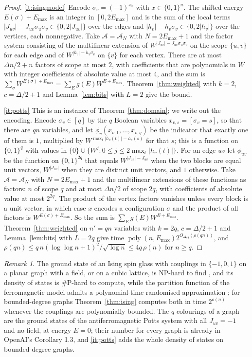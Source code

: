 \documentclass[11pt,reqno]{amsart}
\numberwithin{equation}{section}
\theoremstyle{plain}
\theoremstyle{definition}
\theoremstyle{remark}
\newtheorem{remark}[theorem]{Remark}
\DeclareMathOperator{\poly}{poly}
\newcommand{\A}{\mathcal{A}}
\newcommand{\rhon}{\rho}
\newcommand{\oai}{OpenAI}
\begin{document}
\begin{proof}
\ref{it:isingmodel} Encode $\sigma_v=(-1)^{x_v}$ with $x\in\{0,1\}^n$. The shifted
energy $E(\sigma)+E_{\max}$ is an integer in $[0,2E_{\max}]$ and is the sum of the
local terms $|J_{uv}|-J_{uv}\sigma_u\sigma_v\in\{0,2|J_{uv}|\}$ over the edges
and $|h_v|-h_v\sigma_v\in\{0,2|h_v|\}$ over the vertices, each nonnegative.
Take $\A=\A_N$ with $N=2E_{\max}+1$ and the factor system consisting of the
multilinear extension of $W^{|J_{uv}|-J_{uv}\sigma_u\sigma_v}$ on the scope
$\{u,v\}$ for each edge and of $W^{|h_v|-h_v\sigma_v}$ on $\{v\}$ for each
vertex. There are at most $\Delta n/2+n$ factors of scope at most $2$, with
coefficients that are polynomials in $W$ with integer coefficients of absolute
value at most $4$, and the sum is $\sum_\sigma W^{E(\sigma)+E_{\max}}=\sum_Eg(E)W^{E+E_{\max}}$.
Theorem~\ref{thm:weighted} with $k=2$, $c=\Delta/2+1$ and Lemma~\ref{lem:bits}
with $L=2$ give the bound.

\ref{it:potts} This is an instance of Theorem~\ref{thm:domain}; we write out the encoding. Encode $\sigma_v\in[q]$ by the $q$ Boolean variables
$x_{v,s}=[\sigma_v=s]$, so that there are $qn$ variables, and let
$\phi_v(x_{v,1},\dots,x_{v,q})$ be the indicator that exactly one of them is $1$,
multiplied by $W^{\max_t|h_v(t)|-h_v(s)}$ for that $s$; this is a function on
$\{0,1\}^{q}$ with values in $\{0\}\cup\{W^{j}:0\le j\le2\max_t|h_v(t)|\}$. For an
edge $uv$ let $\phi_{uv}$ be the function on $\{0,1\}^{2q}$ that equals
$W^{|J_{uv}|-J_{uv}}$ when the two blocks are equal unit vectors, $W^{|J_{uv}|}$
when they are distinct unit vectors, and $1$ otherwise. Take $\A=\A_N$ with
$N=2E_{\max}+1$ and the multilinear extensions of these functions as factors:
$n$ of scope $q$ and at most $\Delta n/2$ of scope $2q$, with coefficients of
absolute value at most $2^{2q}$. The product of the vertex factors vanishes
unless every block is a unit vector, in which case $x$ encodes a configuration
$\sigma$ and the product of all factors is $W^{E(\sigma)+E_{\max}}$. So the sum
is $\sum_Eg(E)W^{E+E_{\max}}$. Theorem~\ref{thm:weighted} on $n'=qn$ variables
with $k=2q$, $c=\Delta/2+1$ and Lemma~\ref{lem:bits} with $L=2q$ give time
$\poly(n,E_{\max})2^{O_{\Delta,q}(\rhon(qn))}$, and
$\rhon(qn)\le q\,n(\log\log n+1)^2/\sqrt{\log n}\le4q\,\rhon(n)$ for
$n\ge q$.
\end{proof}

\begin{remark}
The ground state of an Ising spin glass with couplings in $\{-1,0,1\}$ on a
planar graph with a field, or on a cubic lattice, is NP-hard to find
\cite{Barahona82}, and its density of states is $\#$P-hard to compute, while the partition function of the ferromagnetic model admits a polynomial-time randomised approximation \cite{JS93}; for
bounded-degree graphs Theorem~\ref{thm:ising} computes both in time $2^{o(n)}$
whenever the couplings are polynomially bounded. The $q$-colourings of a graph
are the ground states of the antiferromagnetic Potts system with all $J_{uv}=-1$
and no field, at energy $E=0$; their number for every graph is already in
\oai{}'s Corollary 1.3, and \ref{it:potts} adds the whole density of states on
bounded-degree graphs.
\end{remark}
\end{document}
